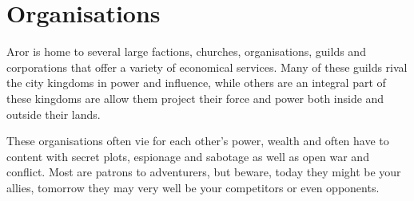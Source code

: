 \section{Organisations}
\label{sec:Organisations}

Aror is home to several large factions, churches, organisations, guilds and
corporations that offer a variety of economical services. Many of these guilds
rival the city kingdoms in power and influence, while others are an integral
part of these kingdoms are allow them project their force and power both
inside and outside their lands.

These organisations often vie for each other's power, wealth and often have
to content with secret plots, espionage and sabotage as well as open war
and conflict. Most are patrons to adventurers, but beware, today they might
be your allies, tomorrow they may very well be your competitors or even
opponents.



